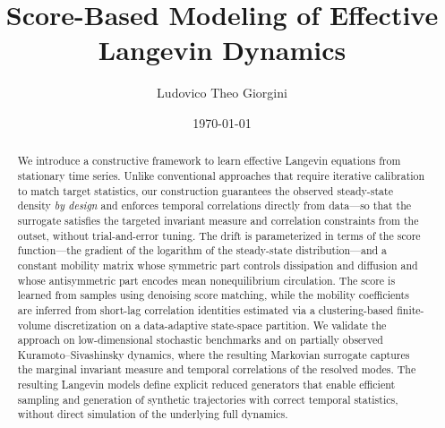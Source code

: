 \documentclass[%
  prl,
  reprint,
  amsmath,
  amssymb,
  aps
]{revtex4-2}
\begin{document}
\title{Score-Based Modeling of Effective Langevin Dynamics}

\author{Ludovico Theo Giorgini}

\date{\today}

\begin{abstract}
We introduce a constructive framework to learn effective Langevin equations from stationary time series. Unlike conventional approaches that require iterative calibration to match target statistics, our construction guarantees the observed steady-state density \emph{by design} and enforces temporal correlations directly from data---so that the surrogate satisfies the targeted invariant measure and correlation constraints from the outset, without trial-and-error tuning. The drift is parameterized in terms of the score function---the gradient of the logarithm of the steady-state distribution---and a constant mobility matrix whose symmetric part controls dissipation and diffusion and whose antisymmetric part encodes mean nonequilibrium circulation. The score is learned from samples using denoising score matching, while the mobility coefficients are inferred from short-lag correlation identities estimated via a clustering-based finite-volume discretization on a data-adaptive state-space partition. We validate the approach on low-dimensional stochastic benchmarks and on partially observed Kuramoto--Sivashinsky dynamics, where the resulting Markovian surrogate captures the marginal invariant measure and temporal correlations of the resolved modes. The resulting Langevin models define explicit reduced generators that enable efficient sampling and generation of synthetic trajectories with correct temporal statistics, without direct simulation of the underlying full dynamics.
\end{abstract}

\maketitle


\end{document}
